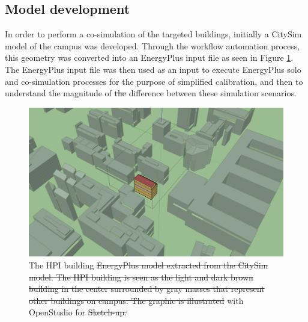 \documentclass{tBPS2e}
\theoremstyle{plain}
\theoremstyle{definition}
\theoremstyle{remark}
\providecommand{\DIFadd}[1]{{\protect\color{blue}\uwave{#1}}} %
\providecommand{\DIFdel}[1]{{\protect\color{red}\sout{#1}}}                      %
\providecommand{\DIFdelbegin}{} %
\providecommand{\DIFdelend}{} %
\providecommand{\DIFaddFL}[1]{\DIFadd{#1}} %
\providecommand{\DIFdelFL}[1]{\DIFdel{#1}} %
\providecommand{\DIFaddbeginFL}{} %
\providecommand{\DIFaddendFL}{} %
\providecommand{\DIFdelbeginFL}{} %
\providecommand{\DIFdelendFL}{} %
\begin{document}
\subsection{Model development}
In order to perform a co-simulation of the targeted buildings, initially a
CitySim model of the campus was developed. Through the workflow automation
process, this geometry was converted into an EnergyPlus input file as seen in
Figure \ref{fig:HPIcampus}. The EnergyPlus input file was then used as an input
to execute EnergyPlus solo and co-simulation processes for the purpose of
simplified calibration, and then to understand the magnitude of \DIFdelbegin \DIFdel{the }\DIFdelend difference
between these simulation scenarios.%

\begin{figure}[H]
\centering
\includegraphics[scale=0.2]{figures/HPI_Campus.png}
\caption{The HPI building \DIFdelbeginFL \DIFdelFL{EnergyPlus model extracted from the CitySim model. The HPI building is seen
as the light and dark brown building in the center surrounded by gray masses that represent other buildings on 
campus. The graphic is illustrated }\DIFdelendFL \DIFaddbeginFL \DIFaddFL{modeled }\DIFaddendFL with OpenStudio for \DIFdelbeginFL \DIFdelFL{Sketch-up.}\DIFdelendFL \DIFaddbeginFL \DIFaddFL{Sketchup}\DIFaddendFL }
\label{fig:HPIcampus}
\end{figure}

\end{document}
